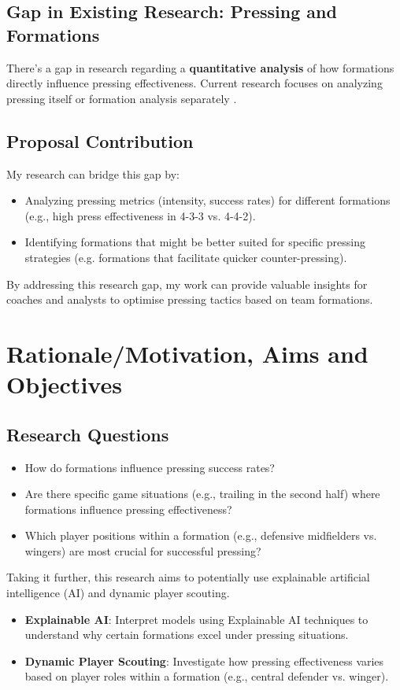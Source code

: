 \documentclass[12pt]{article}
\begin{document}
\subsection{Gap in Existing Research: Pressing and Formations}
There's a gap in research regarding a \textbf{quantitative analysis} of how formations directly influence pressing effectiveness. Current research focuses on analyzing pressing itself or formation analysis separately \cite{forcher2022use}.

\subsection{Proposal Contribution}
My research can bridge this gap by:
\begin{itemize}
    \item Analyzing pressing metrics (intensity, success rates) for different formations (e.g., high press effectiveness in 4-3-3 vs. 4-4-2).
    \item Identifying formations that might be better suited for specific pressing strategies (e.g. formations that facilitate quicker counter-pressing).
\end{itemize}
By addressing this research gap, my work can provide valuable insights for coaches and analysts to optimise pressing tactics based on team formations.

\section{Rationale/Motivation, Aims and Objectives}
\subsection{Research Questions}
\begin{itemize}
    \item How do formations influence pressing success rates?
    \item Are there specific game situations (e.g., trailing in the second half) where formations influence pressing effectiveness?
    \item Which player positions within a formation (e.g., defensive midfielders vs. wingers) are most crucial for successful pressing?
\end{itemize}

Taking it further, this research aims to potentially use explainable artificial intelligence (AI) and dynamic player scouting.
\begin{itemize}
    \item \textbf{Explainable AI}: Interpret models using Explainable AI techniques to understand why certain formations excel under pressing situations.
    \item \textbf{Dynamic Player Scouting}: Investigate how pressing effectiveness varies based on player roles within a formation (e.g., central defender vs. winger).
\end{itemize}
\end{document}

